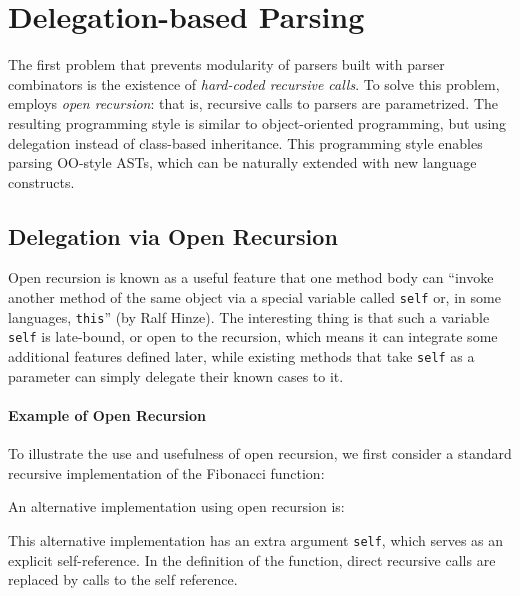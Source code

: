 \section{Delegation-based Parsing}\label{sec:openandparsing}

The first problem that prevents modularity of parsers built with
parser combinators is the existence of \emph{hard-coded recursive
  calls}. To solve this problem, \name employs \emph{open recursion}:
that is, recursive calls to parsers are parametrized. The resulting
programming style is similar to object-oriented programming, 
but using delegation instead of class-based inheritance.
This programming style enables parsing OO-style ASTs, which 
can be naturally extended with new language constructs.

\subsection{Delegation via Open Recursion}\label{subsec:openrecursion}

Open recursion is known as a useful feature that one method body can
``invoke another method of the same object via a special variable
called \lstinline{self} or, in some languages,
\lstinline[keywords={}]{this}'' (by Ralf Hinze). The interesting thing
is that such a variable \lstinline{self} is late-bound, or open to the
recursion, which means it can integrate some additional features
defined later, while existing methods that take \lstinline{self} as a
parameter can simply delegate their known cases to it.

\paragraph{Example of Open Recursion} To illustrate the use and
usefulness of open recursion, we first consider a standard recursive 
implementation of the Fibonacci function:


\noindent An alternative implementation using open recursion is:

\noindent This alternative implementation has an extra argument
\lstinline{self}, which serves as an explicit self-reference. In the 
definition of the function, direct recursive calls are replaced by 
calls to the self reference.

